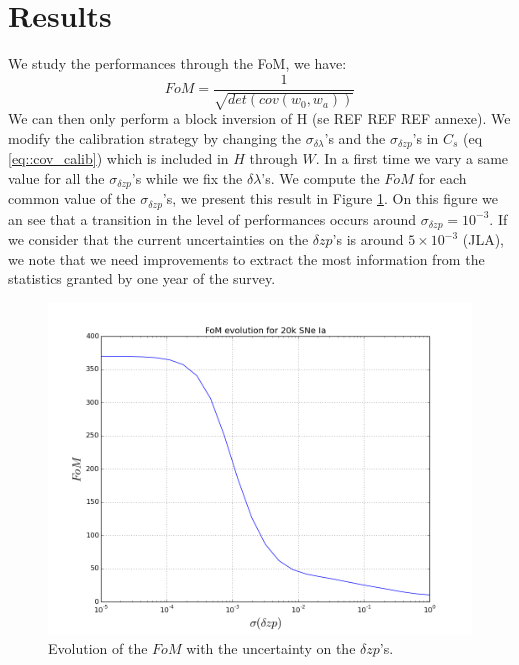 \documentclass[\docopts]{\docclass}
\begin{document}

\section{Results}
\label{sec::results}
We study the performances through the FoM, we have:
\begin{equation}
FoM = \frac{1}{\sqrt{det(cov(w_0, w_a))}}
\end{equation}
We can then only perform a block inversion of H (se REF REF REF annexe).
We modify the calibration strategy by changing the $\sigma_{\delta \lambda}$'s and the $\sigma_{\delta zp}$'s in $C_s$ (eq \ref{eq::cov_calib}) which is included in $H$ through $W$.
In a first time we vary a same value for all the $\sigma_{\delta zp}$'s while we fix the $\delta \lambda$'s.
We compute the $FoM$ for each common value of the $\sigma_{\delta zp}$'s, we present this result in Figure \ref{fig:fom_zp}.
On this figure we an see that a transition in the level of performances occurs around $\sigma_{\delta zp} = 10^{-3}$.
If we consider that the current uncertainties on the $\delta zp$'s is around $5 \times 10^{-3}$ (JLA), we note that we need improvements to extract the most information from the statistics granted by one year of the survey.

\begin{figure}[ht]
  \centering
  \includegraphics[width=0.7\linewidth]{FoM_20k.png}
  \caption{Evolution of the $FoM$ with the uncertainty on the $\delta zp$'s.}
  \label{fig:fom_zp}
\end{figure}

\end{document}
